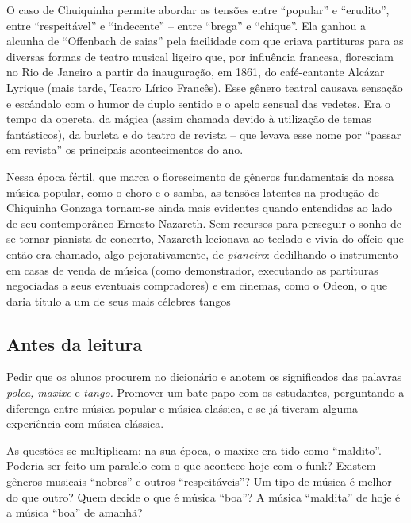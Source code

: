 \documentclass[11pt]{extarticle}
\begin{document}
O caso de Chuiquinha permite abordar as tensões entre ``popular'' e
``erudito'', entre ``respeitável'' e ``indecente'' -- entre ``brega'' e
``chique''. Ela ganhou a alcunha de ``Offenbach de saias'' pela
facilidade com que criava partituras para as diversas formas de teatro
musical ligeiro que, por influência francesa, floresciam no Rio de
Janeiro a partir da inauguração, em 1861, do café-cantante Alcázar
Lyrique (mais tarde, Teatro Lírico Francês). Esse gênero teatral causava
sensação e escândalo com o humor de duplo sentido e o apelo sensual das
vedetes. Era o tempo da opereta, da mágica (assim chamada devido à
utilização de temas fantásticos), da burleta e do teatro de revista --
que levava esse nome por ``passar em revista'' os principais
acontecimentos do ano.

Nessa época fértil, que marca o florescimento de gêneros fundamentais da
nossa música popular, como o choro e o samba, as tensões latentes na
produção de Chiquinha Gonzaga tornam-se ainda mais evidentes quando
entendidas ao lado de seu contemporâneo Ernesto Nazareth. Sem recursos
para perseguir o sonho de se tornar pianista de concerto, Nazareth
lecionava ao teclado e vivia do ofício que então era chamado, algo
pejorativamente, de \emph{pianeiro}: dedilhando o instrumento em casas
de venda de música (como demonstrador, executando as partituras
negociadas a seus eventuais compradores) e em cinemas, como o Odeon, o
que daria título a um de seus mais célebres tangos



\subsection{Antes da leitura}

Pedir que os alunos procurem no dicionário e anotem os significados das
palavras \emph{polca, maxixe} e \emph{tango.} Promover um bate-papo com
os estudantes, perguntando a diferença entre música popular e música
claśsica, e se já tiveram alguma experiência com música clássica.

As questões se multiplicam: na sua época, o maxixe era tido como
``maldito''. Poderia ser feito um paralelo com o que acontece hoje com o
funk? Existem gêneros musicais ``nobres'' e outros ``respeitáveis''? Um
tipo de música é melhor do que outro? Quem decide o que é música
``boa''? A música ``maldita'' de hoje é a música ``boa'' de amanhã?
\end{document}
